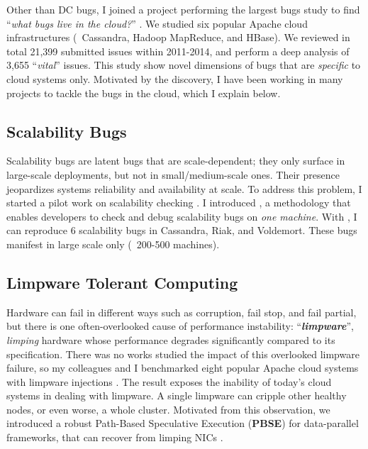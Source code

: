 \documentclass[11pt]{article}
\begin{document}
Other than DC bugs, I joined a project performing the largest bugs study to find
``\textit{what bugs live in the cloud?}'' \cite{Gunawi+14-Cbs}. We studied six
popular Apache cloud infrastructures (\eg\ Cassandra, Hadoop MapReduce, and
HBase). We reviewed in total 21,399 submitted issues within 2011-2014, and
perform a deep analysis of 3,655 ``\textit{vital}'' issues. This study show novel
dimensions of bugs that are \textit{specific} to cloud systems only. Motivated
by the discovery, I have been working in many projects to tackle the
bugs in the cloud, which I explain below.

\subsection{Scalability Bugs}

Scalability bugs are latent bugs that are scale-dependent; they only surface in
large-scale deployments, but not in small/medium-scale ones. Their presence
jeopardizes systems reliability and availability at scale. 
%
To address this problem, I started a pilot work on scalability checking
\cite{Gunawi+17-ScaleCheck-Insub}. I introduced \sck, a methodology that enables
developers to check and debug scalability bugs on \textit{one machine}. With
\sck, I can reproduce 6 scalability bugs in Cassandra, Riak, and Voldemort.
These bugs manifest in large scale only (\eg\ 200-500 machines). 

\subsection{Limpware Tolerant Computing}

Hardware can fail in different ways such as corruption, fail stop, and fail
partial, but there is one often-overlooked cause of performance instability:
``\textbf{\textit{limpware}}'', \textit{limping} hardware whose performance
degrades significantly compared to its specification.  There was no works
studied the impact of this overlooked limpware failure, so my colleagues and I
benchmarked eight popular Apache cloud systems with limpware injections
\cite{Do+13-Limplock}. The result exposes the inability of today's cloud
systems in dealing with limpware. A single limpware can cripple other healthy
nodes, or even worse, a whole cluster.  Motivated from this observation, we
introduced a robust Path-Based Speculative Execution (\textbf{PBSE}) for
data-parallel frameworks, that can recover from limping NICs
\cite{Suminto+17-PBSE-InSub}.
\end{document}

